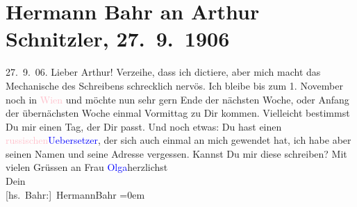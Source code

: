 

               \section[Hermann Bahr an Arthur Schnitzler, 27. 9. 1906]{ Hermann Bahr an Arthur Schnitzler, 27. 9. 1906}\nopagebreak{}\rehead{ }\normalsize\beginnumbering{} \toendnotes[C]{\smallbreak\pagebreak[2]} 
\toendnotes[C]{\smallbreak}\pstart
           \raggedleft{}{\pb}27. 9. 06.\pend
           \pstart\center{}Lieber Arthur!\pend\pstart
           Verzeihe, dass ich dictiere, aber mich macht das Mechanische des Schreibens
               schrecklich nervös.\pend
           \pstart
           Ich bleibe bis zum 1. November noch in \textcolor{pink}{Wien}{}\ledrightnote{\textcolor{pink}{Wien}} und
               möchte nun sehr gern Ende der nächsten Woche, oder Anfang der übernächsten Woche
               einmal Vormittag zu Dir kommen. Vielleicht bestimmst Du mir einen Tag, der Dir
               passt.\pend
           \pstart
           Und noch etwas: Du hast einen \textcolor{pink}{russischen}{}\ledrightnote{\textcolor{pink}{Russland}}{ }{\pb}\textcolor{blue}{Uebersetzer}{}, der sich auch
               einmal an mich gewendet hat, ich habe aber seinen Namen und seine Adresse vergessen.
               Kannst Du mir diese schreiben?\pend
           \pstart
           Mit vielen Grüssen an Frau \textcolor{blue}{Olga}{}\ledrightnote{\textcolor{blue}{Olga Schnitzler}}{\\[\baselineskip]}herzlichst{\\[\baselineskip]}Dein{\\[\baselineskip]}\spacefill\mbox{{[}hs. Bahr:{]} HermannBahr}\pend
           \leftskip=0em{}\endnumbering{}  
      
